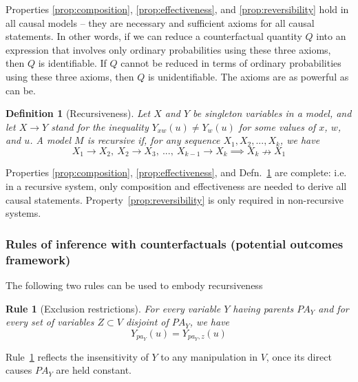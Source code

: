 \documentclass[11pt]{article}
\numberwithin{equation}{section}
\newtheorem{defn}{Definition}[section]
\newtheorem{rle}{Rule}[section]
\begin{document}
Properties \ref{prop:composition}, \ref{prop:effectiveness}, and \ref{prop:reversibility} hold in all causal models -- they are necessary and sufficient axioms for all causal statements. In other words, if we can reduce a counterfactual quantity $Q$ into an expression that involves only ordinary probabilities using these three axioms, then $Q$ is identifiable. If $Q$ cannot be reduced in terms of ordinary probabilities using these three axioms, then $Q$ is unidentifiable. The axioms are as powerful as can be.

\begin{defn}[Recursiveness] \label{def:recursiveness}
Let $X$ and $Y$ be singleton variables in a model, and let $X \rightarrow Y$ stand for the inequality $Y_{xw}(u) \neq Y_w(u)$ for some values of $x$, $w$, and $u$. A model $M$ is recursive if, for any sequence $X_1, X_2, ..., X_k$, we have
\begin{equation}
X_1 \rightarrow X_2,\ X_2 \rightarrow X_3,\ ...,\ X_{k-1} \rightarrow X_k \implies X_k \nrightarrow X_1
\end{equation}
\end{defn}

Properties \ref{prop:composition}, \ref{prop:effectiveness}, and Defn.~\ref{def:recursiveness} are complete: i.e. in a recursive system, only composition and effectiveness are needed to derive all causal statements. Property~\ref{prop:reversibility} is only required in non-recursive systems.


\subsubsection{Rules of inference with counterfactuals (potential outcomes framework)}

The following two rules can be used to embody recursiveness
\begin{rle}[Exclusion restrictions] \label{rle:exclusion-restriction}
For every variable $Y$ having parents $PA_Y$ and for every set of variables $Z \subset V$ disjoint of $PA_Y$, we have
\begin{equation}
Y_{pa_Y}(u) = Y_{pa_Y, z}(u)
\end{equation}
\end{rle} 
Rule~\ref{rle:exclusion-restriction} reflects the insensitivity of $Y$ to any manipulation in $V$, once its direct causes $PA_Y$ are held constant.
\end{document}
